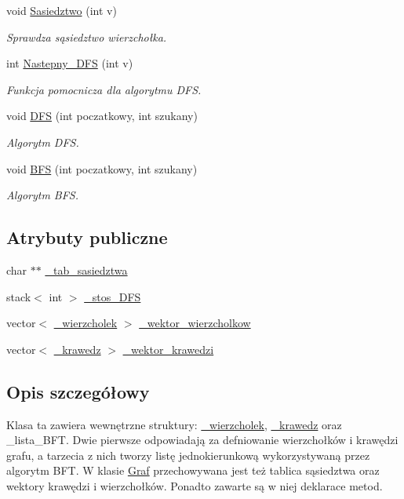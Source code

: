 \begin{DoxyCompactItemize}
void \hyperlink{class_graf_afc14626d6712964761d749568b0ec5af}{\-Sasiedztwo} (int v)
\begin{DoxyCompactList}\small\item\em \-Sprawdza sąsiedztwo wierzchołka. \end{DoxyCompactList}\item 
int \hyperlink{class_graf_a305624fe0009aab3fbbcb1a849de3786}{\-Nastepny\-\_\-\-D\-F\-S} (int v)
\begin{DoxyCompactList}\small\item\em \-Funkcja pomocnicza dla algorytmu \-D\-F\-S. \end{DoxyCompactList}\item 
void \hyperlink{class_graf_a92a75c629930662bb43b72f0d44f8c63}{\-D\-F\-S} (int poczatkowy, int szukany)
\begin{DoxyCompactList}\small\item\em \-Algorytm \-D\-F\-S. \end{DoxyCompactList}\item 
void \hyperlink{class_graf_aa101a5b533a42b4d9c447e8891920fe9}{\-B\-F\-S} (int poczatkowy, int szukany)
\begin{DoxyCompactList}\small\item\em \-Algorytm \-B\-F\-S. \end{DoxyCompactList}\end{DoxyCompactItemize}
\subsection*{\-Atrybuty publiczne}
\begin{DoxyCompactItemize}
\item 
char $\ast$$\ast$ \hyperlink{class_graf_a55dab6e3ffdfbddf0b90cfb2c3eb8a12}{\-\_\-tab\-\_\-sasiedztwa}
\item 
stack$<$ int $>$ \hyperlink{class_graf_aedcc17420188f632ece315f32fbe0b83}{\-\_\-stos\-\_\-\-D\-F\-S}
\item 
vector$<$ \hyperlink{struct_graf_1_1__wierzcholek}{\-\_\-wierzcholek} $>$ \hyperlink{class_graf_a6156d0fd54662028922b4134a92cb357}{\-\_\-wektor\-\_\-wierzcholkow}
\item 
vector$<$ \hyperlink{struct_graf_1_1__krawedz}{\-\_\-krawedz} $>$ \hyperlink{class_graf_a79c79b147cde2bb403d3aa27db8f9f22}{\-\_\-wektor\-\_\-krawedzi}
\end{DoxyCompactItemize}


\subsection{\-Opis szczegółowy}
\-Klasa ta zawiera wewnętrzne struktury\-: \hyperlink{struct_graf_1_1__wierzcholek}{\-\_\-wierzcholek}, \hyperlink{struct_graf_1_1__krawedz}{\-\_\-krawedz} oraz \-\_\-lista\-\_\-\-B\-F\-T. \-Dwie pierwsze odpowiadają za defniowanie wierzchołków i krawędzi grafu, a tarzecia z nich tworzy listę jednokierunkową wykorzystywaną przez algorytm \-B\-F\-T. \-W klasie \hyperlink{class_graf}{\-Graf} przechowywana jest też tablica sąsiedztwa oraz wektory krawędzi i wierzchołków. \-Ponadto zawarte są w niej deklarace metod. 

